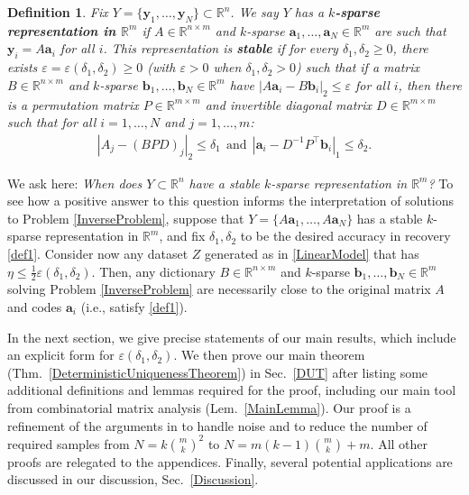 \documentclass[journal, twocolumn]{IEEEtran}
\newtheorem{definition}{Definition}
\begin{document}
\begin{definition}\label{Uniqueness}
Fix $Y = \{ \mathbf{y}_1, \ldots, \mathbf{y}_N\} \subset \mathbb{R}^n$. We say $Y$ has a \textbf{$k$-sparse representation in $\mathbb{R}^m$} if $A \in \mathbb{R}^{n \times m}$ and $k$-sparse $\mathbf{a}_1, \ldots, \mathbf{a}_N \in \mathbb{R}^m$ are such that $\mathbf{y}_i = A\mathbf{a}_i$ for all $i$. This representation is \textbf{stable} if for every $\delta_1, \delta_2 \geq 0$, there exists $\varepsilon = \varepsilon(\delta_1, \delta_2) \geq 0$ (with $\varepsilon > 0$ when  $\delta_1, \delta_2 > 0$) such that if a matrix $B \in \mathbb{R}^{n \times m}$ and $k$-sparse $\mathbf{b}_1, \ldots, \mathbf{b}_N \in \mathbb{R}^m$ have \mbox{$|A\mathbf{a}_i - B\mathbf{b}_i|_2 \leq \varepsilon$} for all $i$, then there is a permutation matrix $P \in \mathbb{R}^{m \times m}$ and invertible diagonal matrix $D \in \mathbb{R}^{m \times m}$ such that for all $i = 1,\ldots,N$ and $j = 1,\ldots,m$:
\begin{align}\label{def1}
|A_j - (BPD)_j|_2 \leq \delta_1 \ \ \text{and} \ \ |\mathbf{a}_i - D^{-1}P^{\top}\mathbf{b}_i|_1 \leq \delta_2.
\end{align}
\end{definition}

We ask here: \emph{When does $Y \subset \mathbb{R}^n$ have a stable $k$-sparse representation in $\mathbb{R}^m$?} To see how a positive answer to this question informs the interpretation of solutions to Problem \ref{InverseProblem}, suppose that \mbox{$Y = \{A \mathbf{a}_1, \ldots, A\mathbf{a}_N\}$} has a stable $k$-sparse representation in $\mathbb R^m$, and fix $\delta_1, \delta_2$ to be the desired accuracy in recovery \eqref{def1}. Consider now any dataset $Z$ generated as in \eqref{LinearModel} that has $\eta \leq \frac{1}{2} \varepsilon(\delta_1, \delta_2)$. Then, any dictionary $B \in \mathbb{R}^{n \times m}$ and $k$-sparse $\mathbf{b}_1, \ldots, \mathbf{b}_N \in \mathbb{R}^m$ solving Problem \ref{InverseProblem} are necessarily close to the original matrix $A$ and codes $\mathbf{a}_i$ (i.e., satisfy \eqref{def1}).  

In the next section, we give precise statements of our main results, which include an explicit form for $\varepsilon(\delta_1, \delta_2)$. We then prove our main theorem (Thm.~\ref{DeterministicUniquenessTheorem}) in Sec.~\ref{DUT} after listing some additional definitions and lemmas required for the proof, including our main tool from combinatorial matrix analysis (Lem.~\ref{MainLemma}). Our proof is a refinement of the arguments in \cite{Hillar15} to handle noise and to reduce the number of required samples from $N=k{m \choose k}^2$ to $N = m(k-1){m \choose k}+m$. All other proofs are relegated to the appendices. Finally, several potential applications are discussed in our discussion, Sec.~\ref{Discussion}.
\end{document}
